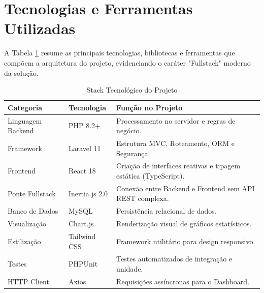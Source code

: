 \section{Tecnologias e Ferramentas Utilizadas}
\label{sec:tecnologias}

A Tabela \ref{tab:stack} resume as principais tecnologias, bibliotecas e ferramentas que compõem a arquitetura do projeto, evidenciando o caráter "Fullstack" moderno da solução.

\begin{table}[htb]
\centering
\caption{Stack Tecnológico do Projeto}
\label{tab:stack}
\begin{tabular}{|l|l|p{6cm}|}
\hline
\textbf{Categoria} & \textbf{Tecnologia} & \textbf{Função no Projeto} \\ \hline
Linguagem Backend & PHP 8.2+ & Processamento no servidor e regras de negócio. \\ \hline
Framework & Laravel 11 & Estrutura MVC, Roteamento, ORM e Segurança. \\ \hline
Frontend & React 18 & Criação de interfaces reativas e tipagem estática (TypeScript). \\ \hline
Ponte Fullstack & Inertia.js 2.0 & Conexão entre Backend e Frontend sem API REST complexa. \\ \hline
Banco de Dados & MySQL & Persistência relacional de dados. \\ \hline
Visualização & Chart.js & Renderização visual de gráficos estatísticos. \\ \hline
Estilização & Tailwind CSS & Framework utilitário para design responsivo. \\ \hline
Testes & PHPUnit & Testes automatizados de integração e unidade. \\ \hline
HTTP Client & Axios & Requisições assíncronas para o Dashboard. \\ \hline
\end{tabular}
\end{table}
